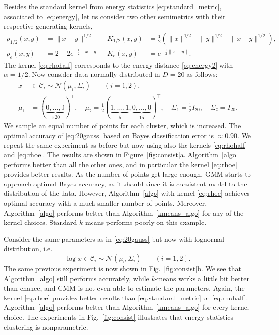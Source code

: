 \documentclass[aps,preprint,nofootinbib,floatfix]{revtex4-1}
\newcommand\kk{K}
\newcommand\C{{\mathcal{C}}}
\begin{document}
Besides the standard kernel from energy statistics 
\eqref{eq:standard_metric}, associated to \eqref{eq:energy}, 
let us consider two other semimetrics with their respective generating
kernels,
\begin{align}
\rho_{1/2}(x,y) &= \| x-y \|^{1/2} & 
 \kk_{1/2}(x,y) &= \tfrac{1}{2} \left( 
\| x \|^{1/2} + \| y \|^{1/2} 
- \| x-y \|^{1/2} \right), \label{eq:rhohalf}\\
\rho_{e}(x,y) &= 
2 - 2 e^{-\tfrac{1}{2}\| x- y\|} &
 \kk_{e}(x,y) &= e^{-\tfrac{1}{2}\| x-y\|}.
\label{eq:rhoe}
\end{align}
The kernel \eqref{eq:rhohalf} corresponds to the energy distance
\eqref{eq:energy2} with $\alpha=1/2$.
Now consider data normally distributed in $D=20$ as follows:
\begin{equation}
\label{eq:20gauss}
\begin{split}
x &\in \C_i \sim \mathcal{N}(\mu_i,\Sigma_i) \qquad (i=1,2), \\
\mu_1 &= (\underbrace{0,\dotsc,0}_{\times 20})^\top ,\quad
\mu_2 = \tfrac{1}{2} 
(\underbrace{1,\dotsc,1}_{5},\underbrace{0,\dotsc,0}_{15})^\top, \quad
\Sigma_1 = \tfrac{1}{2} I_{20},  \quad
\Sigma_2 = I_{20}.
\end{split}
\end{equation}
We sample an equal number of points for each cluster, which is
increased. The optimal accuracy of \eqref{eq:20gauss} based on Bayes
classification error is $\approx 0.90$. We repeat the same experiment as
before but now using also the kernels \eqref{eq:rhohalf} and
\eqref{eq:rhoe}. The results are shown in Figure~\ref{fig:consist}a.
Algorithm~\ref{algo} performs better than all the other ones, and in 
particular the kernel \eqref{eq:rhoe} provides better results.
As the number of points get large enough, GMM starts to approach
optimal Bayes accuracy, 
as it should since it is 
consistent model to the distribution of the data. However, 
Algorithm~\ref{algo} with kernel \eqref{eq:rhoe} achieves optimal accuracy
with a much smaller number of points. Moreover, Algorithm~\ref{algo} performs
better than Algorithm~\ref{kmeans_algo} for any of the kernel choices.
Standard $k$-means performs poorly on this example.

Consider the same parameters as in \eqref{eq:20gauss} but now with
lognormal distribution, i.e.
\begin{equation}
\label{eq:20loggauss}
\log x \in \C_i \sim \mathcal{N}(\mu_i, \Sigma_i) \qquad (i=1,2).
\end{equation}
The same previous experiment is now shown in 
Fig.~\ref{fig:consist}b.
We see that Algorithm~\ref{algo} still performs accurately, 
while $k$-means works a little bit better than chance,
and GMM is not even able to estimate the parameters. Again, the
kernel \eqref{eq:rhoe}
provides better results than \eqref{eq:standard_metric} or
\eqref{eq:rhohalf}. Algorithm~\ref{algo} performs better
than Algorithm~\ref{kmeans_algo} for every kernel choice. 
The experiments in Fig.~\ref{fig:consist}
illustrates that energy statistics clustering is nonparametric.
\end{document}
